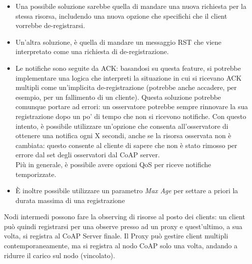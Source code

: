 \documentclass{article}
\begin{document}
\begin{itemize}
    \item Una possibile soluzione sarebbe quella di mandare una nuova richiesta per la stessa risorsa, includendo una nuova opzione che specifichi che il client vorrebbe de-registrarsi.
    \item Un'altra soluzione, è quella di mandare un messaggio RST che viene interpretato come una richiesta di de-registrazione.
    \item Le notifiche sono seguite da ACK: basandosi su questa feature, si potrebbe implementare una logica che interpreti la situazione in cui si ricevano ACK multipli come un'implicita de-registrazione (potrebbe anche accadere, per esempio, per un fallimento di un cliente). Questa soluzione potrebbe comunque portare ad errori: un osservatore potrebbe sempre rinnovare la sua registrazione dopo un po' di tempo che non si ricevono notifiche. Con questo intento, è possibile utilizzare un'opzione che consenta all'osservatore di ottenere una notifica ogni X secondi, anche se la risorsa osservata non è cambiata: questo consente al cliente di sapere che non è stato rimosso per errore dal set degli osservatori dal CoAP server. \\ Più in generale, è possibile avere opzioni QoS per riceve notifiche temporizzate.
    \item È inoltre possibile utilizzare un parametro \textit{Max Age} per settare a priori la durata massima di una registrazione
\end{itemize}
Nodi intermedi possono fare la observing di risorse al posto dei clients: un client può quindi registrarsi per una observe presso ad un proxy e quest'ultimo, a sua volta, si registra al CoAP Server finale. Il Proxy può gestire client multipli contemporaneamente, ma si registra al nodo CoAP solo una volta, andando a ridurre il carico sul nodo (vincolato).
\end{document}
